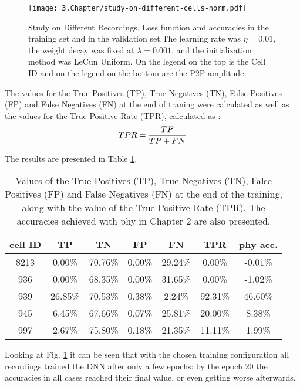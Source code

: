 \begin{figure}[htbp]
	\centering
	\texttt{[image: 3.Chapter/study-on-different-cells-norm.pdf]}
	\caption{Study on Different Recordings. Loss function and accuracies in the training set and in the validation set.The learning rate was $\eta = 0.01$, the weight decay was fixed at $\lambda = 0.001$, and the initialization method was LeCun Uniform. On the legend on the top is the Cell ID and on the legend on the bottom are the P2P amplitude.
}
\label{fig:study-cells}
\end{figure}

The values for the True Positives (TP), True Negatives (TN), False Positives (FP) and False Negatives (FN) at the end of traning were calculated as well as the values for the True Positive Rate (TPR), calculated as :
\begin{equation}
\centering
TPR = \frac{TP}{TP + FN}
\end{equation}

The results are presented in Table \ref{table:confusion-matrix}.

\begin{table}[htbp]
\begin{center}
\begin{tabular}{c|cccc|cc}
cell ID & TP & TN & FP & FN & TPR & phy acc.\\ \hline
8213 & 0.00\% & 70.76\% & 0.00\% & 29.24\% & 0.00\% & -0.01\% \\
936 & 0.00\% & 68.35\% & 0.00\% & 31.65\% & 0.00\% & -1.02\% \\ 
939 & 26.85\% & 70.53\% & 0.38\% & 2.24\% & 92.31\% & 46.60\% \\ 
945 & 6.45\% & 67.66\% & 0.07\% & 25.81\% & 20.00\% & 8.38\% \\ 
997 & 2.67\% & 75.80\% & 0.18\% & 21.35\% & 11.11\% & 1.99\% \\ 
\end{tabular}
\end{center}
\caption{Values of the True Positives (TP), True Negatives (TN), False Positives (FP) and False Negatives (FN) at the end of the training, along with the value of the True Positive Rate (TPR). The accuracies achieved with phy in Chapter 2 are also presented. }
\label{table:confusion-matrix}
\end{table}

Looking at Fig. \ref{fig:study-cells} it can be seen that with the chosen training configuration all recordings trained the DNN after only a few epochs: by the epoch 20 the accuracies in all cases reached their final value, or even getting worse afterwards. 

